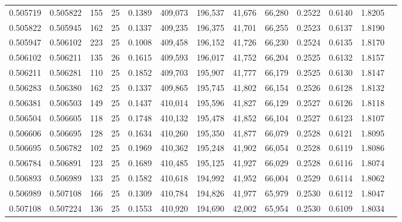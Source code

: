 \begin{tabular}{rrrrrrrrrrrrr}
0.505719 & 0.505822 &   155 &  25 &                                     0.1389 & 409,073 & 196,537 &  41,676 &  66,280 & 0.2522 & 0.6140 & 1.8205 \\
0.505822 & 0.505945 &   162 &  25 &                                     0.1337 & 409,235 & 196,375 &  41,701 &  66,255 & 0.2523 & 0.6137 & 1.8190 \\
0.505947 & 0.506102 &   223 &  25 &                                     0.1008 & 409,458 & 196,152 &  41,726 &  66,230 & 0.2524 & 0.6135 & 1.8170 \\
0.506102 & 0.506211 &   135 &  26 &                                     0.1615 & 409,593 & 196,017 &  41,752 &  66,204 & 0.2525 & 0.6132 & 1.8157 \\
0.506211 & 0.506281 &   110 &  25 &                                     0.1852 & 409,703 & 195,907 &  41,777 &  66,179 & 0.2525 & 0.6130 & 1.8147 \\
0.506283 & 0.506380 &   162 &  25 &                                     0.1337 & 409,865 & 195,745 &  41,802 &  66,154 & 0.2526 & 0.6128 & 1.8132 \\
0.506381 & 0.506503 &   149 &  25 &                                     0.1437 & 410,014 & 195,596 &  41,827 &  66,129 & 0.2527 & 0.6126 & 1.8118 \\
0.506504 & 0.506605 &   118 &  25 &                                     0.1748 & 410,132 & 195,478 &  41,852 &  66,104 & 0.2527 & 0.6123 & 1.8107 \\
0.506606 & 0.506695 &   128 &  25 &                                     0.1634 & 410,260 & 195,350 &  41,877 &  66,079 & 0.2528 & 0.6121 & 1.8095 \\
0.506695 & 0.506782 &   102 &  25 &                                     0.1969 & 410,362 & 195,248 &  41,902 &  66,054 & 0.2528 & 0.6119 & 1.8086 \\
0.506784 & 0.506891 &   123 &  25 &                                     0.1689 & 410,485 & 195,125 &  41,927 &  66,029 & 0.2528 & 0.6116 & 1.8074 \\
0.506893 & 0.506989 &   133 &  25 &                                     0.1582 & 410,618 & 194,992 &  41,952 &  66,004 & 0.2529 & 0.6114 & 1.8062 \\
0.506989 & 0.507108 &   166 &  25 &                                     0.1309 & 410,784 & 194,826 &  41,977 &  65,979 & 0.2530 & 0.6112 & 1.8047 \\
0.507108 & 0.507224 &   136 &  25 &                                     0.1553 & 410,920 & 194,690 &  42,002 &  65,954 & 0.2530 & 0.6109 & 1.8034 \\

\end{tabular}
